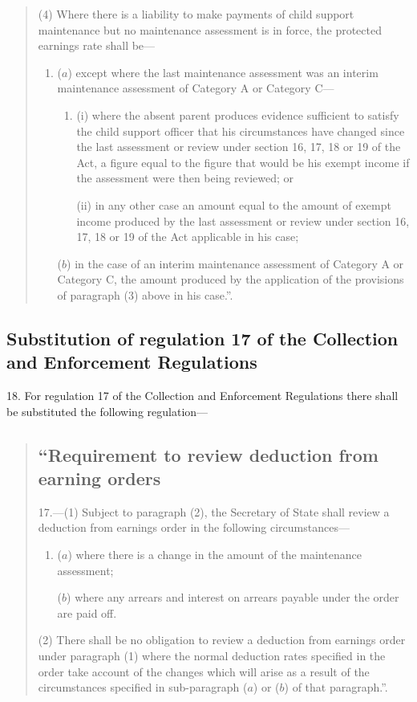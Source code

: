 \documentclass[12pt,a4paper]{article}
\begin{document}
\begin{quotation}
(4) Where there is a liability to make payments of child support maintenance but no maintenance assessment is in force, the protected earnings rate shall be—
\begin{enumerate}\item[]
($a$) except where the last maintenance assessment was an interim maintenance assessment of Category A or Category C—
\begin{enumerate}\item[]
(i) where the absent parent produces evidence sufficient to satisfy the child support officer that his circumstances have changed since the last assessment or review under section 16, 17, 18 or 19 of the Act, a figure equal to the figure that would be his exempt income if the assessment were then being reviewed; or

(ii) in any other case an amount equal to the amount of exempt income produced by the last assessment or review under section 16, 17, 18 or 19 of the Act applicable in his case;
\end{enumerate}

($b$) in the case of an interim maintenance assessment of Category A or Category C, the amount produced by the application of the provisions of paragraph (3) above in his case.”.
\end{enumerate}
\end{quotation}

\subsection[18. Substitution of regulation 17 of the Collection and Enforcement Regulations]{Substitution of regulation 17 of the Collection and Enforcement Regulations}

18.  For regulation 17 of the Collection and Enforcement Regulations there shall be substituted the following regulation—
\begin{quotation}
\subsection*{\sloppy “Requirement to review deduction from earning orders}

17.—(1) Subject to paragraph (2), the Secretary of State shall review a deduction from earnings order in the following circumstances—
\begin{enumerate}\item[]
($a$) where there is a change in the amount of the maintenance assessment;

($b$) where any arrears and interest on arrears payable under the order are paid off.
\end{enumerate}

(2) There shall be no obligation to review a deduction from earnings order under paragraph (1) where the normal deduction rates specified in the order take account of the changes which will arise as a result of the circumstances specified in sub-paragraph ($a$) or ($b$) of that paragraph.”.
\end{quotation}
\end{document}
